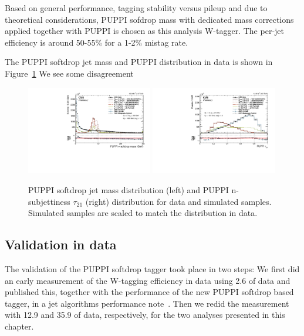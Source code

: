 Based on general performance, tagging stability versus pileup and due to theoretical considerations, PUPPI sofdrop mass with dedicated mass corrections applied together with PUPPI \nsubj is chosen as this analysis W-tagger. The per-jet efficiency is around 50-55\% for a 1-2\% mistag rate.\par

The PUPPI softdrop jet mass and PUPPI \nsubj distribution in data is shown in Figure~\ref{fig:searchII:wtag}
We see some disagreement
\begin{figure}[h!]
\centering
\includegraphics[width=0.49\textwidth]{figures/analysis/search2/AN-16-235/plots/qcdcp_PuppiSoftdropMass.pdf}
\includegraphics[width=0.49\textwidth]{figures/analysis/search2/AN-16-235/plots/qcdcp_puppi_tau2tau1.pdf}
\caption{PUPPI softdrop jet mass distribution (left) and PUPPI n-subjettiness $\tau_{21}$ (right) distribution for data and simulated samples. Simulated samples are scaled to match the distribution in data.}
\label{fig:searchII:wtag}
\end{figure}

\clearpage

\subsection{Validation in data}  
The validation of the PUPPI softdrop tagger took place in two steps: We first did an early measurement of the W-tagging efficiency in data using 2.6 \fbinv of data and published this, together with the performance of the new PUPPI softdrop based tagger, in a jet algorithms performance note~\cite{CMS-PAS-JME-16-003}. Then we redid the measurement with 12.9 and 35.9 \fbinv of data, respectively, for the two analyses presented in this chapter.

